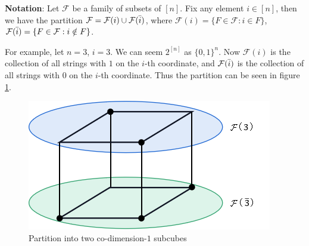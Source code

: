 \documentclass{article}
\theoremstyle{definition}
\begin{document}
\textbf{Notation}: Let $\mathcal{F}$ be a family of subsets of $[n]$. Fix any element $i \in [n]$, then we have the partition $\mathcal{F} = \mathcal{F}(i) \cup \mathcal{F}(\Bar{i})$, where $\mathcal{F}(i) = \{ F \in \mathcal{F}: i\in F \}$, $\mathcal{F}(\Bar{i}) = \{ F \in \mathcal{F}: i\notin F \}$.

For example, let $n=3$, $i=3$. We can seem $2^[n]$ as $\{0,1\}^n$. Now $\mathcal{F}(i)$ is the collection of all strings with $1$ on the $i$-th coordinate, and $\mathcal{F}(\Bar{i})$ is the collection of all strings with $0$ on the $i$-th coordinate. Thus the partition can be seen in figure \ref{fig:16-1}.
\begin{figure}[H]
        \centering
        \includegraphics[scale=0.5]{16-1.png}
        \caption{Partition into two co-dimension-$1$ subcubes}
        \label{fig:16-1}
\end{figure}
\end{document}
